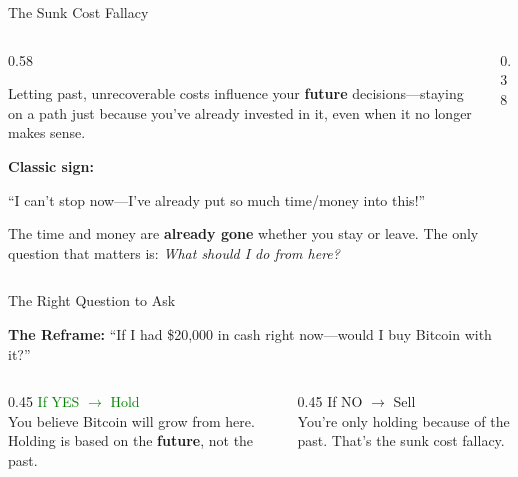 \documentclass[9pt,english,aspectratio=169]{beamer}
\begin{document}
\begin{frame}{The Sunk Cost Fallacy}

  \begin{columns}[T]
    \begin{column}{0.58\textwidth}
      \begin{definitionbox}
        Letting past, unrecoverable costs influence your \textbf{future}
        decisions---staying on a path just because you've already invested in it,
        even when it no longer makes sense.
      \end{definitionbox}

      \vspace{0.5em}
      \textbf{Classic sign:}
      \begin{quotebox}
        ``I can't stop now---I've already put so much time/money into this!''
      \end{quotebox}

      \vspace{0.3em}
      The time and money are \textbf{already gone} whether you stay or leave.
      The only question that matters is: \emph{What should I do from here?}
    \end{column}
    \begin{column}{0.38\textwidth}
    \end{column}
  \end{columns}

\end{frame}



\begin{frame}{The Right Question to Ask}

  \begin{insightbox}
    \textbf{The Reframe:} ``If I had \$20{,}000 in cash right now---would I buy Bitcoin with it?''
  \end{insightbox}

  \vspace{0.5em}
  \begin{columns}[T]
    \begin{column}{0.45\textwidth}
      \centering
      \textcolor{green}{\large If YES $\rightarrow$ Hold}\\[0.3em]
      You believe Bitcoin will grow from here.
      Holding is based on the \textbf{future}, not the past.
    \end{column}
    \begin{column}{0.45\textwidth}
      \centering
      \textcolor{vermillion}{\large If NO $\rightarrow$ Sell}\\[0.3em]
      You're only holding because of the past.
      That's the sunk cost fallacy.
    \end{column}
  \end{columns}

\end{frame}
\end{document}
